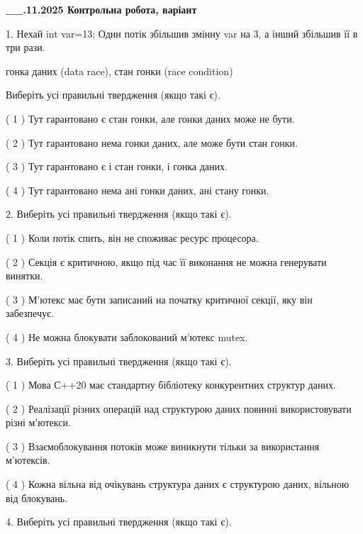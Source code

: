 \documentclass[12pt, ukrainian]{article}
\begin{document}
\newpage
\begin {large}

\textbf{\_\_.11.2025 Контрольна робота, варіант  }\par


{
1. Нехай int var=13; Один потік збільшив змінну var на 3, а інший збільшив її в три рази.

гонка даних (data race), стан гонки (race condition)

Виберіть усі правильні твердження (якщо такі є).\par
\vspace{2mm}
( 1 ) Тут гарантовано є стан гонки, але гонки даних може не бути.%

( 2 ) Тут гарантовано нема гонки даних, але може бути стан гонки.%

( 3 ) Тут гарантовано є і стан гонки, і гонка даних.%

( 4 ) Тут гарантовано нема ані гонки даних, ані стану гонки.%


2. Виберіть усі правильні твердження (якщо такі є).\par
\vspace{2mm}

( 1 ) Коли потік спить, він не споживає ресурс процесора.%

( 2 ) Секція є критичною, якщо під час її виконання не можна генерувати винятки.%

( 3 ) М’ютекс має бути записаний на початку критичної секції, яку він забезпечує.%

( 4 ) Не можна блокувати заблокований м’ютекс mutex.%


3. Виберіть усі правильні твердження (якщо такі є).\par
\vspace{2mm}

( 1 ) Мова С++20 має стандартну бібліотеку конкурентних структур даних.%

( 2 ) Реалізації різних операцій над структурою даних повинні використовувати різні м’ютекси.%

( 3 ) Взаємоблокування потоків може виникнути тільки за використання м’ютексів.%

( 4 ) Кожна вільна від очікувань структура даних є структурою даних, вільною від блокувань.%


4. Виберіть усі правильні твердження (якщо такі є).\par
\vspace{2mm}

}
\end{large}
\end{document}
